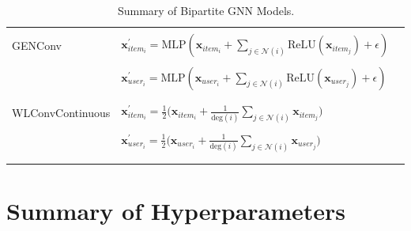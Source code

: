 \documentclass[bst/sn-nature]{sn-jnl}
\begin{document}
\begin{appendices}
\begin{longtable}{|l|l|l|}
     & \\
    GENConv & $\mathbf{x}_{item_{i}}^{\prime} = \mathrm{MLP} \left( \mathbf{x}_{item_{i}} +
    \sum_{j \in \mathcal{N}(i)} 
    \mathrm{ReLU} \left( \mathbf{x}_{item_{j}} \right) +\epsilon \right)$ \\
     & \\
     & $\mathbf{x}_{user_{i}}^{\prime} = \mathrm{MLP} \left( \mathbf{x}_{user_{i}} +
    \sum_{j \in \mathcal{N}(i)} 
    \mathrm{ReLU} \left( \mathbf{x}_{user_{j}} \right) +\epsilon \right)$ \\
     & \\

    \rowcolor[gray]{0.9} & \\
    \rowcolor[gray]{0.9} WLConvContinuous &     $\mathbf{x}^{\prime}_{item_{i}} = \frac{1}{2}\big(\mathbf{x}_{item_{i}} +
    \frac{1}{\textrm{deg}(i)}
    \sum_{j \in \mathcal{N}(i)}  \mathbf{x}_{item_{j}} \big)$ \\
    \rowcolor[gray]{0.9} & \\
    \rowcolor[gray]{0.9} & $\mathbf{x}^{\prime}_{user_{i}} = \frac{1}{2}\big(\mathbf{x}_{user_{i}} +
    \frac{1}{\textrm{deg}(i)}
    \sum_{j \in \mathcal{N}(i)} \mathbf{x}_{user_{j}} \big)$ \\
    \rowcolor[gray]{0.9} & \\
    
    \hline
    \caption{Summary of Bipartite GNN Models.}
    \label{tab:recall}
\end{longtable}

\clearpage

\section{Summary of Hyperparameters}\label{secA2}
 

\end{appendices}
\end{document}
